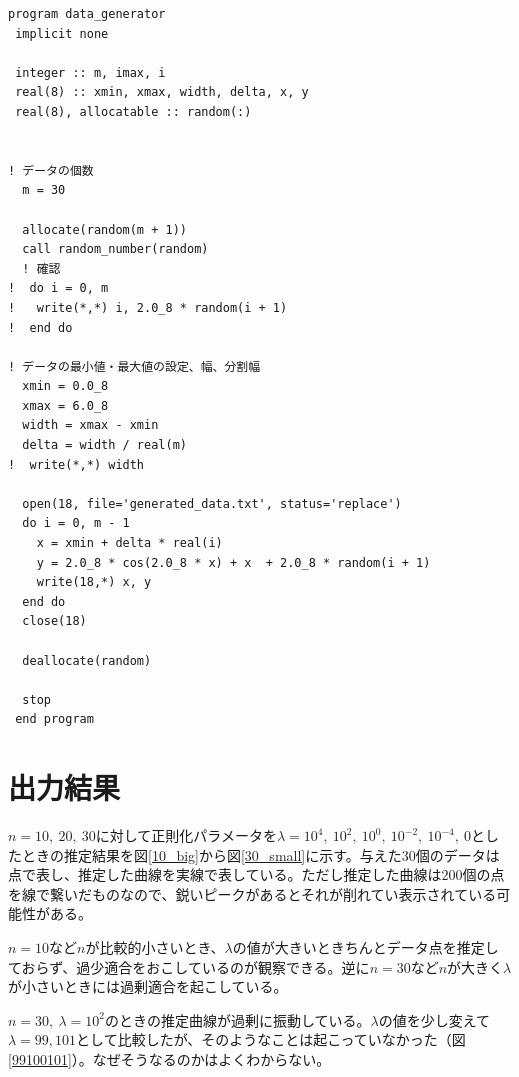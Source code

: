 \documentclass[dvipdfmx,autodetect-engine]{jsarticle}%
\begin{document}
\begin{lstlisting}[caption=データ生成のためのプログラム,label=data_generator]
program data_generator
 implicit none

 integer :: m, imax, i
 real(8) :: xmin, xmax, width, delta, x, y
 real(8), allocatable :: random(:)


! データの個数
  m = 30

  allocate(random(m + 1))
  call random_number(random)
  ! 確認
!  do i = 0, m
!   write(*,*) i, 2.0_8 * random(i + 1)
!  end do

! データの最小値・最大値の設定、幅、分割幅
  xmin = 0.0_8
  xmax = 6.0_8
  width = xmax - xmin
  delta = width / real(m)
!  write(*,*) width

  open(18, file='generated_data.txt', status='replace')
  do i = 0, m - 1
    x = xmin + delta * real(i)
    y = 2.0_8 * cos(2.0_8 * x) + x  + 2.0_8 * random(i + 1)
    write(18,*) x, y
  end do
  close(18)

  deallocate(random)
  
  stop
 end program
\end{lstlisting}


\section{出力結果}
$n=10,~20,~30$に対して正則化パラメータを$\lambda = 10^4,~10^2,~10^0,~10^{-2},~10^{-4},~0$としたときの推定結果を図\ref{10_big}から図\ref{30_small}に示す。与えた30個のデータは点で表し、推定した曲線を実線で表している。ただし推定した曲線は$200$個の点を線で繋いだものなので、鋭いピークがあるとそれが削れてい表示されている可能性がある。

$n=10$など$n$が比較的小さいとき、$\lambda$の値が大きいときちんとデータ点を推定しておらず、過少適合をおこしているのが観察できる。逆に$n=30$など$n$が大きく$\lambda$が小さいときには過剰適合を起こしている。

$n=30,~\lambda = 10^2$のときの推定曲線が過剰に振動している。$\lambda$の値を少し変えて$\lambda=99,101$として比較したが、そのようなことは起こっていなかった（図\ref{99100101}）。なぜそうなるのかはよくわからない。　　　
\end{document}
